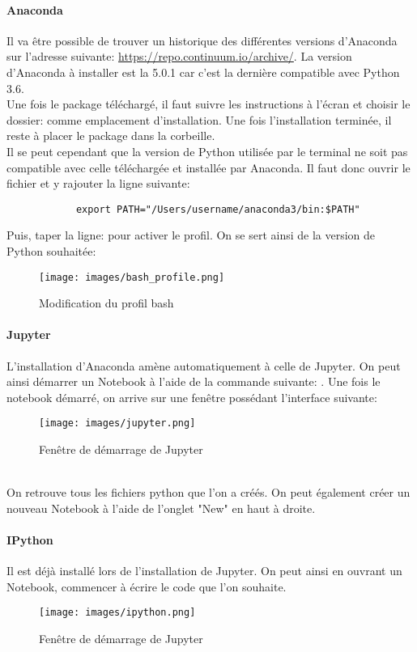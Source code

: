 \documentclass[12pt,twoside, openright]{memoir}
\newcommand{\courrier}[1]{{\fontfamily{qcr}\selectfont {#1}}}
\begin{document}
\begin{appendices}
		\paragraph*{Anaconda} Il va être possible de trouver un historique des différentes versions d'Anaconda sur l'adresse suivante: \url{https://repo.continuum.io/archive/}. La version d'Anaconda à installer est la 5.0.1 car c'est la dernière compatible avec Python 3.6.\\
		Une fois le package téléchargé, il faut suivre les instructions à l'écran et choisir le dossier: \courrier{/Users/username} comme emplacement d'installation. Une fois l'installation terminée, il reste à placer le package dans la corbeille.\\
		Il se peut cependant que la version de Python utilisée par le terminal ne soit pas compatible avec celle téléchargée et installée par Anaconda. Il faut donc ouvrir le fichier \courrier{/Users/username/.bash_profile} et y rajouter la ligne suivante:
		\begin{verbatim}
			export PATH="/Users/username/anaconda3/bin:$PATH"
		\end{verbatim}
		Puis, taper la ligne: \courrier{source /Users/username/.bash_profile} pour activer le profil. On se sert ainsi de la version de Python souhaitée:
		\begin{figure}[!ht]
			\centering
			\texttt{[image: images/bash\_profile.png]}
			\caption{Modification du profil bash}
		\end{figure}
		\paragraph*{Jupyter} L'installation d'Anaconda amène automatiquement à celle de Jupyter. On peut ainsi démarrer un Notebook à l'aide de la commande suivante: \courrier{jupyter notebook}.
		Une fois le notebook démarré, on arrive sur une fenêtre possédant l'interface suivante:
		\begin{figure}[!ht]
			\centering
			\texttt{[image: images/jupyter.png]}
			\caption{Fenêtre de démarrage de Jupyter}
		\end{figure}\\
		On retrouve tous les fichiers python que l'on a créés. On peut également créer un nouveau Notebook à l'aide de l'onglet "New" en haut à droite.
		\paragraph*{IPython} Il est déjà installé lors de l'installation de Jupyter. On peut ainsi en ouvrant un Notebook, commencer à écrire le code que l'on souhaite.
		\begin{figure}[!ht]
			\centering
			\texttt{[image: images/ipython.png]}
			\caption{Fenêtre de démarrage de Jupyter}
		\end{figure}
	

\end{appendices}
\end{document}

